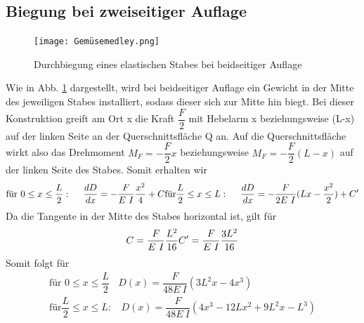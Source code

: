 \subsection{Biegung bei zweiseitiger Auflage}
    \begin{figure}
        \centering
        \texttt{[image: Gemüsemedley.png]}
        \caption{Durchbiegung eines elastischen Stabes bei beidseitiger Auflage}
        \label{fig:gemüse}
    \end{figure}
    Wie in Abb. \ref{fig:gemüse} dargestellt, wird bei beidseitiger Auflage ein Gewicht in der Mitte des 
    jeweiligen Stabes installiert, sodass dieser sich zur Mitte hin biegt. Bei dieser 
    Konstruktion greift am Ort x die Kraft $\dfrac{F}{2}$ mit Hebelarm x 
    beziehungsweise (L-x) auf der linken Seite an der Querschnittsfläche Q
    an. Auf die Querschnittsfläche wirkt also das Drehmoment $M_F = -\dfrac{F}{2} x$ 
    beziehungsweise $M_F = -\dfrac{F}{2}(L-x)$ auf der linken Seite des Stabes.
    Somit erhalten wir 
    \begin{equation}
        \text{für } 0 \leq x \leq \dfrac{L}{2}:\ \ \ \ \dfrac{d D}{dx}=-\dfrac{F}{E\ I}\dfrac{x^2}{4}+C \\
        \text{für} \dfrac{L}{2} \leq x \leq L:\ \ \ \ \dfrac{d D}{dx}=-\dfrac{F}{2 E\ I}(Lx - \dfrac{x^2}{2})+C'
    \end{equation}
    Da die Tangente in der Mitte des Stabes horizontal ist, gilt für 
    \begin{equation*}
        C = \dfrac{F}{E\ I}\dfrac{L^2}{16} \\
        C'=\dfrac{F}{E\ I}\dfrac{3L^2}{16}
    \end{equation*}
    Somit folgt für 
    \begin{align}
        \text{für } 0 \leq x \leq \dfrac{L}{2}\ \ \ \ D(x)=\dfrac{F}{48 E\ I}(3L^2x-4x^3) \label{eqn:kurt} \\
        \text{für} \dfrac{L}{2} \leq x \leq L:\ \ \ \ D(x)=\dfrac{F}{48 E\ I}(4 x^3-12Lx^2+9L^2x-L^3) \label{eqn:fred}
    \end{align}

